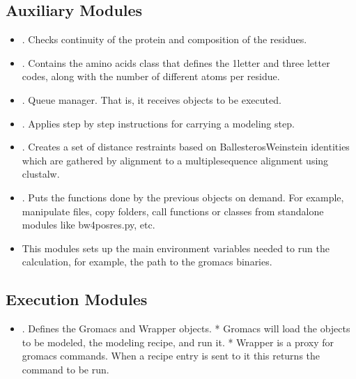 \documentclass[letterpaper,10pt,english]{sphinxmanual}
\begin{document}
\subsection{Auxiliary Modules}
\label{\detokenize{installation:auxiliary-modules}}\begin{itemize}
\item {} 
\sphinxAtStartPar
{}. Checks continuity of the protein and composition of the
residues.

\item {} 
\sphinxAtStartPar
{}. Contains the amino acids class that defines the 1\sphinxhyphen{}letter
and three letter codes, along with the number of different atoms per residue.

\item {} 
\sphinxAtStartPar
{}.   Queue  manager.  That  is,  it  receives  objects to  be
executed.

\item {} 
\sphinxAtStartPar
{}.   Applies  step by  step instructions  for  carrying a
modeling  step.

\item {} 
\sphinxAtStartPar
{}. Creates a set of distance restraints based on
Ballesteros\sphinxhyphen{}Weinstein identities which are gathered by alignment to a
multiple\sphinxhyphen{}sequence alignment using clustalw.

\item {} 
\sphinxAtStartPar
{}.  Puts the  functions done by the previous objects on demand.
For example, manipulate files, copy  folders, call functions or classes from
standalone modules like bw4posres.py, etc.

\item {} 
\sphinxAtStartPar
{} This modules sets up the main environment variables needed
to run the calculation, for example, the path to the gromacs binaries.

\end{itemize}


\subsection{Execution Modules}
\label{\detokenize{installation:execution-modules}}\begin{itemize}
\item {} 
\sphinxAtStartPar
{}. Defines the Gromacs and Wrapper objects. * Gromacs
will load the objects to be modeled, the modeling recipe, and run it.
* Wrapper is a proxy for gromacs commands. When a recipe entry is
sent to it this returns the command to be run.

\end{itemize}
\end{document}
